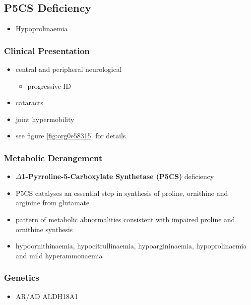\documentclass[12pt]{scrartcl}
\begin{document}
\begin{center}
\begin{center}
\subsection{P5CS  Deficiency}
\label{sec:orgb9e6bde}
\begin{itemize}
\item Hypoprolinaemia
\end{itemize}
\subsubsection{Clinical Presentation}
\label{sec:orgde716cb}
\begin{itemize}
\item central and peripheral neurological
\begin{itemize}
\item progressive ID
\end{itemize}
\item cataracts
\item joint hypermobility
\item see figure \ref{fig:org0e58315} for details
\end{itemize}

\subsubsection{Metabolic Derangement}
\label{sec:orgefe8f90}
\begin{itemize}
\item \textbf{\(\Delta\)1-Pyrroline-5-Carboxylate Synthetase (P5CS)} deficiency
\item P5CS catalyses an essential step in synthesis of proline, ornithine
and arginine from glutamate
\end{itemize}


\begin{itemize}
\item pattern of metabolic abnormalities consistent with impaired proline
and ornithine synthesis
\item hypoornithinaemia, hypocitrullinaemia, hypoargininaemia,
hypoprolinaemia and mild hyperammonaemia
\end{itemize}

\subsubsection{Genetics}
\label{sec:org1f10b74}
\begin{itemize}
\item AR/AD ALDH18A1
\end{itemize}


\end{center}
\end{center}
\end{document}
